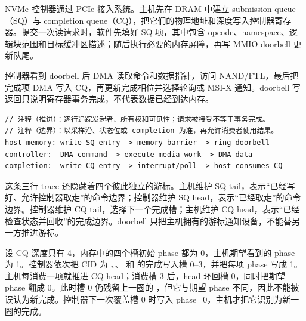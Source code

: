 NVMe 控制器通过 PCIe 接入系统。主机先在 DRAM 中建立 submission queue（SQ）与 completion queue（CQ），把它们的物理地址和深度写入控制器寄存器。提交一次读请求时，软件先填好 SQ 项，其中包含 opcode、namespace、逻辑块范围和目标缓冲区描述；随后执行必要的内存屏障，再写 MMIO doorbell 更新队尾。

控制器看到 doorbell 后 DMA 读取命令和数据指针，访问 NAND/FTL，最后把完成项 DMA 写入 CQ，再更新完成相位并选择轮询或 MSI-X 通知。doorbell 写返回只说明寄存器事务完成，不代表数据已经到达内存。

\begin{lstlisting}
// 注释（推进）：逐行追踪发起者、所有权和可见性；请求被接受不等于事务完成。
// 注释（边界）：以采样沿、状态位或 completion 为准，再允许消费者使用结果。
host memory: write SQ entry -> memory barrier -> ring doorbell
controller:  DMA command -> execute media work -> DMA data
completion:  write CQ entry -> interrupt/poll -> host consumes CQ
\end{lstlisting}

这条三行 trace 还隐藏着四个彼此独立的游标。主机维护 SQ tail，表示“已经写好、允许控制器取走”的命令边界；控制器维护 SQ head，表示“已经取走”的命令边界。控制器维护 CQ tail，选择下一个完成槽；主机维护 CQ head，表示“已经检查状态并回收”的完成边界。doorbell 只把主机拥有的游标通知设备，不能替另一方推进游标。


设 CQ 深度只有 4，内存中的四个槽初始 phase 都为 0，主机期望看到的 phase 为 1。控制器依次把 CID 为 、、 和  的完成写入槽 0--3，并把每项 phase 写成 1。主机每消费一项就推进 CQ head；消费槽 3 后，head 环回槽 0，同时把期望 phase 翻成 0。此时槽 0 仍残留上一圈的 ，但它与期望 phase 不同，因此不能被误认为新完成。控制器下一次覆盖槽 0 时写入 phase=0，主机才把它识别为新一圈的完成。\cite{nvme-spec}


